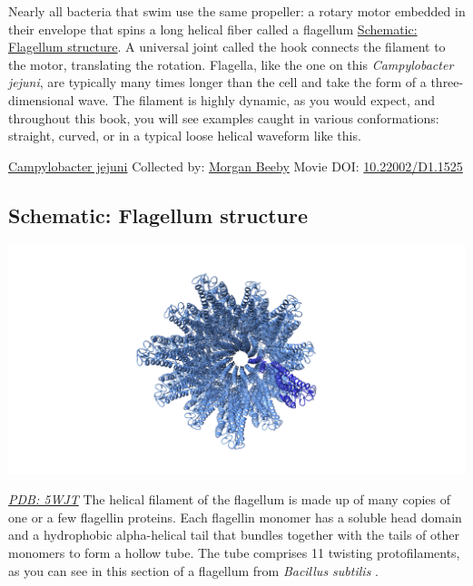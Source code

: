\documentclass[]{tufte-book}
\begin{document}
Nearly all bacteria that swim use the same propeller: a rotary motor embedded in their envelope that spins a long helical fiber called a flagellum \protect\hyperlink{Flagellum_structure}{Schematic: Flagellum structure}. A universal joint called the hook connects the filament to the motor, translating the rotation. Flagella, like the one on this \emph{Campylobacter jejuni}, are typically many times longer than the cell and take the form of a three-dimensional wave. The filament is highly dynamic, as you would expect, and throughout this book, you will see examples caught in various conformations: straight, curved, or in a typical loose helical waveform like this.



\hypertarget{htmlwidget-be21334beed30f03b5b4}{}

\label{fig:6-1}\protect\hyperlink{tree}{Campylobacter jejuni} Collected by: \protect\hyperlink{morgan_beeby}{Morgan Beeby} Movie DOI: \href{https://doi.org/10.22002/D1.1525}{10.22002/D1.1525}

\hypertarget{Flagellum_structure}{%
\subsection*{Schematic: Flagellum structure}\label{Flagellum_structure}}

\includegraphics{img/schematics/6_1_1}

\href{http://rcsb.org/structure/5WJT}{\emph{PDB: 5WJT}}
The helical filament of the flagellum is made up of many copies of one or a few flagellin proteins. Each flagellin monomer has a soluble head domain and a hydrophobic alpha-helical tail that bundles together with the tails of other monomers to form a hollow tube. The tube comprises 11 twisting protofilaments, as you can see in this section of a flagellum from \emph{Bacillus subtilis} \citep{wang2017}.
\end{document}
